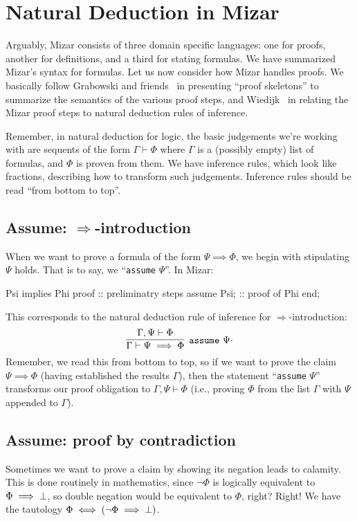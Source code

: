 \section{Natural Deduction in Mizar}

Arguably, Mizar consists of three domain specific languages: one for
proofs, another for definitions, and a third for stating formulas. We
have summarized Mizar's syntax for formulas. Let us now consider how
Mizar handles proofs. We basically follow Grabowski and
friends~\cite{grabowski2010mizar} in presenting ``proof skeletons'' to
summarize the semantics of the various proof steps, and
Wiedijk~\cite{wiedijk2000mv} in relating the Mizar proof steps to
natural deduction rules of inference.

Remember, in natural deduction for logic, the basic judgements we're
working with are sequents of the form $\Gamma\vdash\Phi$ where $\Gamma$
is a (possibly empty) list of formulas, and $\Phi$ is proven from
them. We have inference rules, which look like fractions, describing how
to transform such judgements. Inference rules should be read ``from
bottom to top''.

\subsection{Assume: $\Longrightarrow$-introduction}
When we want to prove a formula of the form $\Psi\implies\Phi$, we begin
with stipulating $\Psi$ holds. That is to say, we ``\lstinline{assume} $\Psi$''.
In Mizar:

\begin{mizar}
Psi implies Phi
proof
  :: preliminatry steps
  assume Psi;
  :: proof of Phi
end;
\end{mizar}

This corresponds to the natural deduction rule of inference for
$\Longrightarrow$-introduction:
\begin{equation}
  \vcenter{\infer[\mathtt{assume}~\Psi]{\Gamma\vdash\Psi\implies\Phi}{\Gamma,\Psi\vdash\Phi}}.
\end{equation}
Remember, we read this from bottom to top, so if we want to prove
the claim $\Psi\implies\Phi$ (having established the results $\Gamma$),
then the statement ``\lstinline{assume} $\Psi$'' transforms our proof
obligation to $\Gamma,\Psi\vdash\Phi$ (i.e., proving $\Phi$ from the
list $\Gamma$ with $\Psi$ appended to $\Gamma$).

\subsection{Assume: proof by contradiction}
Sometimes we want to prove a claim by showing its negation leads to
calamity. This is done routinely in mathematics, since $\neg\Phi$ is
logically equivalent to $\Phi\implies\bot$, so double negation
would be equivalent to $\Phi$, right? Right! We have the tautology
$\Phi\iff(\neg\Phi\implies\bot)$.

